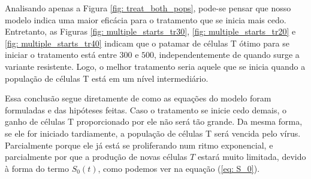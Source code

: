 Analisando apenas a Figura \ref{fig: treat_both_pops}, pode-se pensar que nosso modelo indica uma maior eficácia para o tratamento que se inicia mais cedo.
Entretanto, as Figuras \ref{fig: multiple_starts_tr30}, \ref{fig: multiple_starts_tr20} e \ref{fig: multiple_starts_tr40} indicam que o patamar de células T ótimo para se iniciar o tratamento está entre \( 300 \) e \( 500 \), independentemente de quando surge a variante resistente.
Logo, o melhor tratamento seria aquele que se inicia quando a população de células T está em um nível intermediário.

Essa conclusão segue diretamente de como as equações do modelo foram formuladas e das hipóteses feitas.
Caso o tratamento se inicie cedo demais, o ganho de células T proporcionado por ele não será tão grande.
Da mesma forma, se ele for iniciado tardiamente, a população de células T será vencida pelo vírus.
Parcialmente porque ele já está se proliferando num ritmo exponencial, e parcialmente por que a produção de novas células \( T \) estará muito limitada, devido à forma do termo \( S_{ 0 } ( t ) \), como podemos ver na equação (\ref{eq: S_0}).
